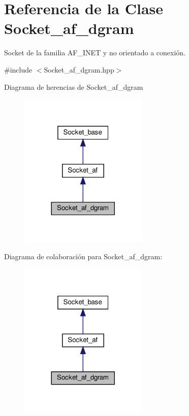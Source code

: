 \hypertarget{classSocket__af__dgram}{}\section{Referencia de la Clase Socket\+\_\+af\+\_\+dgram}
\label{classSocket__af__dgram}


Socket de la familia A\+F\+\_\+\+I\+N\+ET y no orientado a conexión.  




{\ttfamily \#include $<$Socket\+\_\+af\+\_\+dgram.\+hpp$>$}



Diagrama de herencias de Socket\+\_\+af\+\_\+dgram\nopagebreak
\begin{figure}[H]
\begin{center}
\leavevmode
\includegraphics[width=173pt]{classSocket__af__dgram__inherit__graph}
\end{center}
\end{figure}


Diagrama de colaboración para Socket\+\_\+af\+\_\+dgram\+:\nopagebreak
\begin{figure}[H]
\begin{center}
\leavevmode
\includegraphics[width=173pt]{classSocket__af__dgram__coll__graph}
\end{center}
\end{figure}

